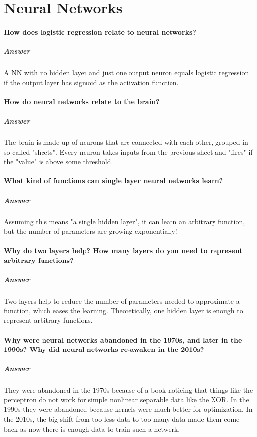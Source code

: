 \documentclass[a4paper, 11pt, accentcolor = tud3b]{tudreport}
\newcommand{\answer}[1]{\subparagraph{Answer} #1}
\begin{document}
		\section{Neural Networks}
			\paragraph{How does logistic regression relate to neural networks?}
			\answer{A NN with no hidden layer and just one output neuron equals logistic regression if the output layer has sigmoid as the activation function.}

			\paragraph{How do neural networks relate to the brain?}
			\answer{The brain is made up of neurons that are connected with each other, grouped in so-called "sheets". Every neuron takes inputs from the previous sheet and "fires" if the "value" is above some threshold.}

			\paragraph{What kind of functions can single layer neural networks learn?}
			\answer{Assuming this means "a single hidden layer", it can learn an arbitrary function, but the number of parameters are growing exponentially!}

			\paragraph{Why do two layers help? How many layers do you need to represent arbitrary functions?}
			\answer{Two layers help to reduce the number of parameters needed to approximate a function, which eases the learning. Theoretically, one hidden layer is enough to represent arbitrary functions.}

			\paragraph{Why were neural networks abandoned in the 1970s, and later in the 1990s? Why did neural networks re-awaken in the 2010s?}
			\answer{They were abandoned in the 1970s because of a book noticing that things like the perceptron do not work for simple nonlinear separable data like the XOR. In the 1990s they were abandoned because kernels were much better for optimization. In the 2010s, the big shift from too less data to too many data made them come back as now there is enough data to train such a network.}
\end{document}
